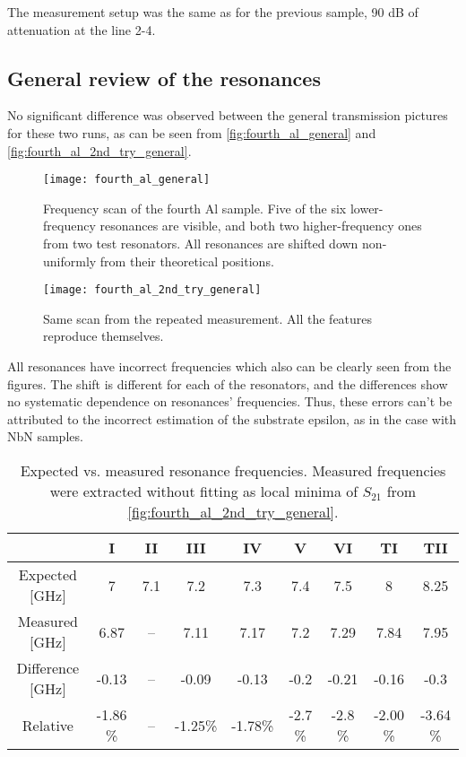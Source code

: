\documentclass[12pt]{article}
\numberwithin{equation}{section}
\numberwithin{figure}{section}
\begin{document}
The measurement setup was the same as for the previous sample, 90 dB of attenuation at the line 2-4.
\subsection{General review of the resonances}

No significant difference was observed between the general transmission pictures for these two runs, as can be seen from \autoref{fig:fourth_al_general} and \autoref{fig:fourth_al_2nd_try_general}.


\begin{figure}[h]
\centering
\texttt{[image: fourth\_al\_general]}
\caption{Frequency scan of the fourth Al sample. Five of the six lower-frequency resonances are visible, and both two higher-frequency ones from two test resonators. All resonances are shifted down non-uniformly from their theoretical positions.}
\label{fig:fourth_al_general}
\end{figure}


\begin{figure}[h]
\centering
\texttt{[image: fourth\_al\_2nd\_try\_general]}
\caption{Same scan from the repeated measurement. All the features reproduce themselves.}
\label{fig:fourth_al_2nd_try_general}
\end{figure}

All resonances have incorrect frequencies which also can be clearly seen from the figures. The shift is different for each of the resonators, and the differences show no systematic dependence on resonances' frequencies. Thus, these errors can't be attributed to the incorrect estimation of the substrate epsilon, as in the case with NbN samples.

\begin{table}[h]
\centering
\bgroup
\def\arraystretch{1.5}%
\begin{tabular}{c|*{8}{c}}
  & I & II & III & IV & V & VI & TI & TII \\
\hline
Expected [GHz]& 7 & 7.1 & 7.2 & 7.3 & 7.4 & 7.5 & 8 & 8.25\\
Measured [GHz] & 6.87& -- &  7.11&  7.17&  7.2 &  7.29&  7.84&  7.95 \\
Difference [GHz]& -0.13& -- & -0.09& -0.13& -0.2 & -0.21& -0.16& -0.3 \\
Relative &-1.86 \%& -- & -1.25\%& -1.78\%& -2.7 \%& -2.8 \%& -2.00  \%& -3.64 \%
\end{tabular}
\egroup
\caption{Expected vs. measured resonance frequencies. Measured frequencies were extracted without fitting as local minima of $S_{21}$ from \autoref{fig:fourth_al_2nd_try_general}.}
\label{tab:freqs_third_al}
\end{table}
\end{document}
